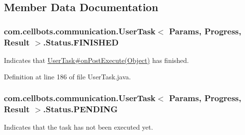 \subsection{Member Data Documentation}
\hypertarget{enumcom_1_1cellbots_1_1communication_1_1_user_task_3_01_params_00_01_progress_00_01_result_01_4_1_1_status_aec5ddfb5758dd8c63de0691395a0e4d0}{
\subsubsection[{F\-I\-N\-I\-S\-H\-E\-D}]{\setlength{\rightskip}{0pt plus 5cm}com.\-cellbots.\-communication.\-User\-Task$<$ Params, Progress, Result $>$.Status.\-F\-I\-N\-I\-S\-H\-E\-D}}\label{enumcom_1_1cellbots_1_1communication_1_1_user_task_3_01_params_00_01_progress_00_01_result_01_4_1_1_status_aec5ddfb5758dd8c63de0691395a0e4d0}
Indicates that \hyperlink{}{User\-Task\#on\-Post\-Execute(\-Object)} has finished. 

Definition at line 186 of file User\-Task.\-java.

\hypertarget{enumcom_1_1cellbots_1_1communication_1_1_user_task_3_01_params_00_01_progress_00_01_result_01_4_1_1_status_a5a5867ebfc48af8653eb686810396a99}{
\subsubsection[{P\-E\-N\-D\-I\-N\-G}]{\setlength{\rightskip}{0pt plus 5cm}com.\-cellbots.\-communication.\-User\-Task$<$ Params, Progress, Result $>$.Status.\-P\-E\-N\-D\-I\-N\-G}}\label{enumcom_1_1cellbots_1_1communication_1_1_user_task_3_01_params_00_01_progress_00_01_result_01_4_1_1_status_a5a5867ebfc48af8653eb686810396a99}
Indicates that the task has not been executed yet. 


